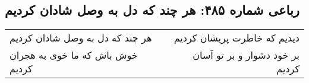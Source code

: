 \begin{center}
\section*{رباعی شماره ۴۸۵: هر چند که دل به وصل شادان کردیم}
\label{sec:sh485}
\begin{longtable}{l p{0.5cm} r}
هر چند که دل به وصل شادان کردیم
&&
دیدیم که خاطرت پریشان کردیم
\\
خوش باش که ما خوی به هجران کردیم
&&
بر خود دشوار و بر تو آسان کردیم
\\
\end{longtable}
\end{center}
